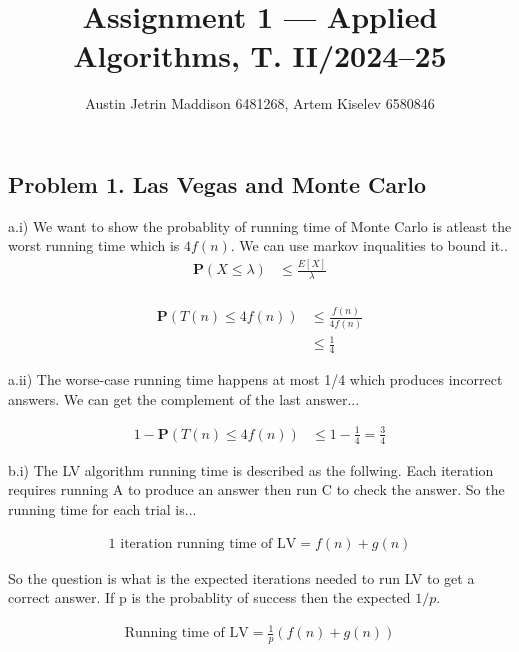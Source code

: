 \documentclass[12pt]{article}
\title{Assignment 1 — Applied Algorithms, T. II/2024–25}
\author{Austin Jetrin Maddison 6481268, Artem Kiselev 6580846}
\begin{document}
	\small
	
	\maketitle
	
	\vspace{0.5in}
	
	\subsection*{Problem 1. Las Vegas and Monte Carlo}
	
	
	a.i) We want to show the probablity of running time of Monte Carlo is atleast the worst running time which is $4f(n)$. We can use markov inqualities to bound it..
	\\

	\begin{align*}
		\textbf{P}(X \le \lambda ) & \le \frac{ E [ X ] }{ \lambda }\\
	\end{align*}

	\begin{align*}
		\textbf{P}(T(n) \le 4f(n) ) & \le \frac{f(n)}{4f(n)}\\
								    & \le \frac{1}{4}		
	\end{align*}
	
	a.ii) The worse-case running time happens at most 1/4 which produces incorrect answers. We can get the complement of the last answer...    

	\begin{align*}
		1 - \textbf{P}(T(n) \le 4f(n) ) &  \le 1 - \frac{1}{4} = \frac{3}{4}
	\end{align*}
	
	b.i) The LV algorithm running time is described as the follwing. Each iteration requires running A to produce an answer then run C to check the answer. So the running time for each trial is...
	
	\begin{align*}
		\text{1 iteration running time of LV} = f(n) + g(n)
	\end{align*}

	So the question is what is the expected iterations needed to run LV to get a correct answer. If p is the probablity of success then the expected $1/p$.

	\begin{align*}
		\text{Running time of LV} = \frac{1}{p}(f(n) + g(n))
	\end{align*}
\end{document}
